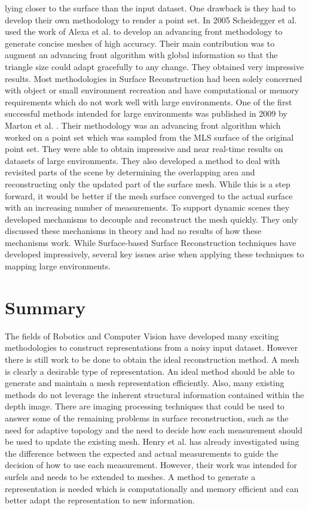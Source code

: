 lying closer to the surface than the input dataset. One drawback is they
had to develop their own methodology to render a point set. In 2005
Scheidegger et al. used the work of Alexa et al. to develop an advancing
front methodology to generate concise meshes of high accuracy. Their main
contribution was to augment an advancing front algorithm with global
information so that the triangle size could adapt gracefully to any change.
They obtained very impressive results. Most methodologies in Surface
Reconstruction had been solely concerned with object or small environment
recreation and have computational or memory requirements which do not work
well with large environments. One of the first successful methods intended
for large environments was published in 2009 by Marton et al.
\cite{Marton2009}. Their methodology was an advancing front algorithm which
worked on a point set which was sampled from the MLS surface of the
original point set. They were able to obtain impressive and near real-time
results on datasets of large environments. They also developed a method to
deal with revisited parts of the scene by determining the overlapping area
and reconstructing only the updated part of the surface mesh. While this is a
step forward, it would be better if the mesh surface converged
to the actual surface with an increasing number of measurements. To support
dynamic scenes they developed mechanisms to decouple and reconstruct the
mesh quickly. They only discussed these mechanisms in theory and had no
results of how these mechanisms work. While Surface-based Surface Reconstruction
techniques have developed impressively, several key issues arise
when applying these techniques to mapping large environments.

\section{Summary}

The fields of Robotics and Computer Vision have developed many exciting
methodologies to construct representations from a noisy input dataset. However
there is still work to be done to obtain the ideal reconstruction method. A mesh
is clearly a desirable type of representation. An ideal method should be able to
generate and maintain a mesh representation efficiently. Also, many existing
methods do not leverage the inherent structural information contained within the
depth image. There are imaging processing techniques that could be used to
answer some of the remaining problems in surface reconstruction, such as the
need for adaptive topology and the need to decide how each measurement should be
used to update the existing mesh. Henry et al. \cite{Henry2012} has already
investigated using the difference between the expected and actual measurements
to guide the decision of how to use each measurement. However, their work was
intended for surfels and needs to be extended to meshes. A method to generate a
representation is needed which is computationally and memory efficient and can
better adapt the representation to new information.
